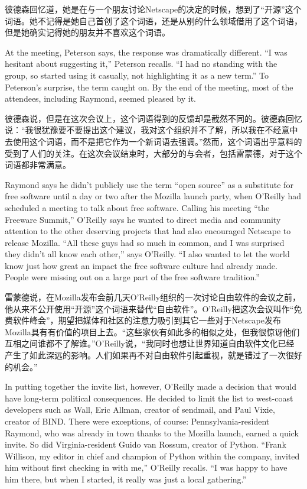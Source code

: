 \ifdefined\chs
彼德森回忆道，她是在与一个朋友讨论Netscape的决定的时候，想到了``开源''这个词语。她不记得是她自己首创了这个词语，还是从别的什么领域借用了这个词语，但是她确实记得她的朋友并不喜欢这个词语。
\fi

\ifdefined\eng
At the meeting, Peterson says, the response was dramatically different. ``I was hesitant about suggesting it,'' Peterson recalls. ``I had no standing with the group, so started using it casually, not highlighting it as a new term.'' To Peterson's surprise, the term caught on. By the end of the meeting, most of the attendees, including Raymond, seemed pleased by it.
\fi

\ifdefined\chs
彼德森说，但是在这次会议上，这个词语得到的反馈却是截然不同的。彼德森回忆说：``我很犹豫要不要提出这个建议，我对这个组织并不了解，所以我在不经意中去使用这个词语，而不是把它作为一个新词语去强调。''然而，这个词语出乎意料的受到了人们的关注。在这次会议结束时，大部分的与会者，包括雷蒙德，对于这个词语都非常满意。
\fi

\ifdefined\eng
Raymond says he didn't publicly use the term ``open source'' as a substitute for free software until a day or two after the Mozilla launch party, when O'Reilly had scheduled a meeting to talk about free software. Calling his meeting ``the Freeware Summit,'' O'Reilly says he wanted to direct media and community attention to the other deserving projects that had also encouraged Netscape to release Mozilla. ``All these guys had so much in common, and I was surprised they didn't all know each other,'' says O'Reilly. ``I also wanted to let the world know just how great an impact the free software culture had already made. People were missing out on a large part of the free software tradition.''
\fi

\ifdefined\chs
雷蒙德说，在Mozilla发布会前几天O'Reilly组织的一次讨论自由软件的会议之前，他从来不公开使用``开源''这个词语来替代``自由软件''。O'Reilly把这次会议叫作``免费软件峰会''，期望把媒体和社区的注意力吸引到其它一些对于Netscape发布Mozilla具有有价值的项目上去。``这些家伙有如此多的相似之处，但我很惊讶他们互相之间谁都不了解谁。''O'Reilly说，``我同时也想让世界知道自由软件文化已经产生了如此深远的影响。人们如果再不对自由软件引起重视，就是错过了一次很好的机会。''
\fi

\ifdefined\eng
In putting together the invite list, however, O'Reilly made a decision that would have long-term political consequences. He decided to limit the list to west-coast developers such as Wall, Eric Allman, creator of sendmail, and Paul Vixie, creator of BIND. There were exceptions, of course: Pennsylvania-resident Raymond, who was already in town thanks to the Mozilla launch, earned a quick invite. So did Virginia-resident Guido van Rossum, creator of Python. ``Frank Willison, my editor in chief and champion of Python within the company, invited him without first checking in with me,'' O'Reilly recalls. ``I was happy to have him there, but when I started, it really was just a local gathering.''
\fi

